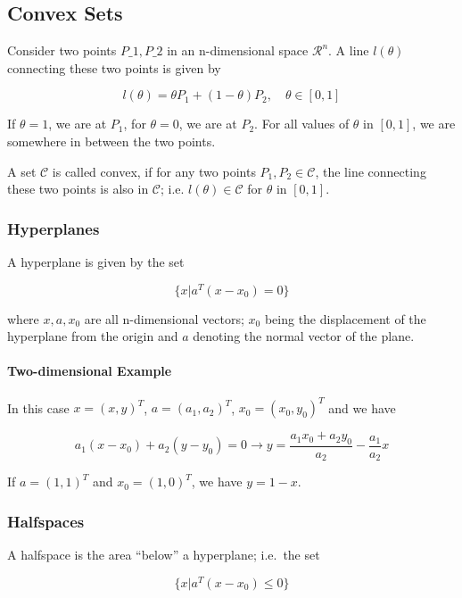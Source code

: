 
\subsection{Convex Sets}

Consider two points $P\_1, P\_2$ in an n-dimensional space $\mathcal{R}^n$. A line $l(\theta)$ connecting these two points is given by

\[
l(\theta) = \theta P_1 + (1-\theta) P_2, \quad \theta \in [0,1]
\]

If $\theta=1$, we are at $P_1$, for $\theta=0$, we are at $P_2$. For all values of $\theta$ in $[0,1]$, we are somewhere in between the two points.

A set $\mathcal{C}$ is called convex, if for any two points $P_1, P_2
\in \mathcal{C}$, the line connecting these two points is also in $\mathcal{C}$; i.e. $l(\theta) \in \mathcal{C}$ for $\theta$ in $[0,1]$.

\subsubsection{Hyperplanes}

A hyperplane is given by the set

\[ \{ x | a^T (x - x_0) = 0 \} \]

where $x, a, x_0$ are all n-dimensional vectors; $x_0$ being the displacement of the hyperplane from the origin and $a$ denoting the normal vector of the plane.

\paragraph{Two-dimensional Example}

In this case $x = (x , y)^T$, $a = (a_1 , a_2)^T$, $x_0 = (x_0 , y_0)^T$ and we have

\[
a_1(x - x_0) + a_2(y - y_0) = 0 \rightarrow y = \frac{a_1 x_0 + a_2 y_0}{a_2} - \frac{a_1}{a_2}x
\]

If $a = (1 , 1)^T$ and $x_0 = (1 , 0)^T$, we have $y = 1-x$.

\subsubsection{Halfspaces}

A halfspace is the area ``below'' a hyperplane; i.e.~the set

\[ \{ x | a^T (x - x_0) \leq 0 \} \]

